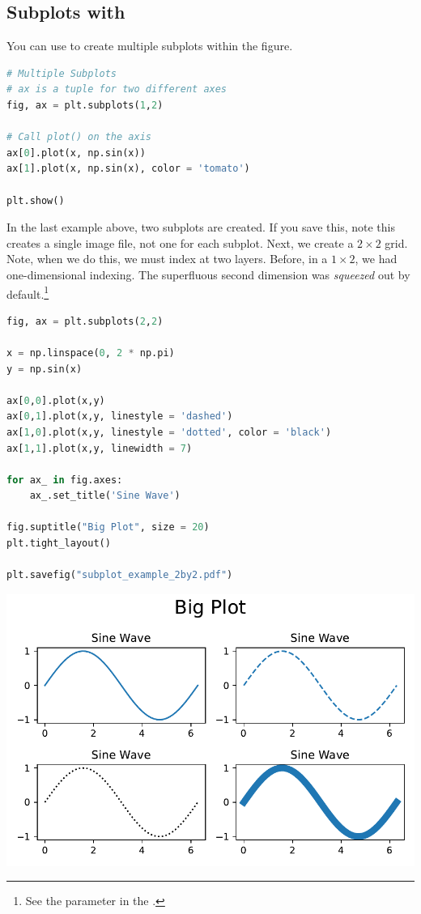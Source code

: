 \subsection{Subplots with }

You can use  to create multiple subplots within the figure.

\begin{lstlisting}[language = Python]
# Multiple Subplots
# ax is a tuple for two different axes
fig, ax = plt.subplots(1,2)

# Call plot() on the axis
ax[0].plot(x, np.sin(x))
ax[1].plot(x, np.sin(x), color = 'tomato')

plt.show()
\end{lstlisting}

In the last example above, two subplots are created. If you save this, note this creates a single image file, not one for each subplot. Next, we create a $2\times 2$ grid. Note, when we do this, we must index  at two layers. Before, in a $1\times2$, we had one-dimensional indexing. The superfluous second dimension was \emph{squeezed} out by default.\footnote{See the  parameter in the .}

\begin{lstlisting}[language = Python]
fig, ax = plt.subplots(2,2)

x = np.linspace(0, 2 * np.pi)
y = np.sin(x)

ax[0,0].plot(x,y)
ax[0,1].plot(x,y, linestyle = 'dashed')
ax[1,0].plot(x,y, linestyle = 'dotted', color = 'black')
ax[1,1].plot(x,y, linewidth = 7)

for ax_ in fig.axes:
    ax_.set_title('Sine Wave')

fig.suptitle("Big Plot", size = 20)
plt.tight_layout()

plt.savefig("subplot_example_2by2.pdf")
\end{lstlisting}

\begin{center}
    \includegraphics[width = .6\textwidth]{images/subplot_example_2by2.pdf}
\end{center}